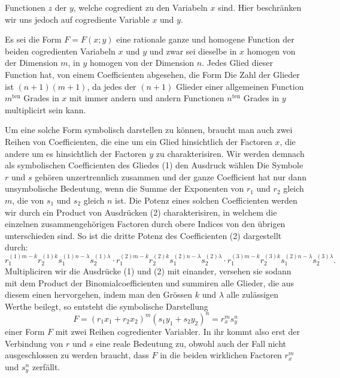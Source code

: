 Functionen $z$ der $y$, welche cogredient zu den Variabeln $x$ sind. Hier beschränken wir uns jedoch auf cogrediente Variable $x$ und $y$.

Es sei die Form $F=F(x;y)$ eine rationale ganze und homogene Function der beiden cogredienten Variabeln $x$ und $y$ und zwar sei dieselbe in $x$ homogen von der Dimension $m$, in $y$ homogen von der Dimension $n$. Jedes Glied dieser Function hat, von einem Coefficienten abgesehen, die Form
Die Zahl der Glieder ist $(n+1)(m+1)$, da jedes der $(n+1)$ Glieder einer allgemeinen Function $m^{\text{ten}}$ Grades in $x$ mit immer andern und andern Functionen $n^{\text{ten}}$ Grades in $y$ multiplicirt sein kann.

Um eine solche Form symbolisch darstellen zu können, braucht man auch zwei Reihen von Coefficienten, die eine um ein Glied hinsichtlich der Factoren $x$, die andere um es hinsichtlich der Factoren $y$ zu charakterisiren. Wir werden demnach als symbolischen Coefficienten des Gliedes (1) den Ausdruck wählen
Die Symbole $r$ und $s$ gehören unzertrennlich zusammen und der ganze Coefficient hat nur dann unsymbolische Bedeutung, wenn die Summe der Exponenten von $r_1$ und $r_2$ gleich $m$, die von $s_1$ und $s_2$ gleich $n$ ist. Die Potenz eines solchen Coefficienten werden wir durch ein Product von Ausdrücken (2) charakterisiren, in welchem die einzelnen zusammengehörigen Factoren durch obere Indices von den übrigen unterschieden sind. So ist die dritte Potenz des Coefficienten (2) dargestellt durch:
\[
r_1^{(1)m-k}r_2^{(1)k}s_1^{(1)n-\lambda}s_2^{(1)\lambda}\cdot r_1^{(2)m-k}r_2^{(2)k}s_1^{(2)n-\lambda}s_2^{(2)\lambda}\cdot r_1^{(3)m-k}r_2^{(3)k}s_1^{(2)n-\lambda}s_2^{(3)\lambda}.
\]
Multipliciren wir die Ausdrücke (1) und (2) mit einander, versehen sie sodann mit dem Product der Binomialcoefficienten
und summiren alle Glieder, die aus diesem einen hervorgehen, indem man den Grössen $k$ und $\lambda$ alle zulässigen Werthe beilegt, so entsteht die symbolische Darstellung
\[
F=(r_1x_1+r_2x_2)^m(s_1y_1+s_2y_2)^n=r_x^m s_y^n
\]
einer Form $F$ mit zwei Reihen cogredienter Variabler. In ihr kommt also erst der Verbindung von $r$ und $s$ eine reale Bedeutung zu, obwohl auch der Fall nicht ausgeschlossen zu werden braucht, dass $F$ in die beiden wirklichen Factoren $r_x^m$ und $s_y^n$ zerfällt.


